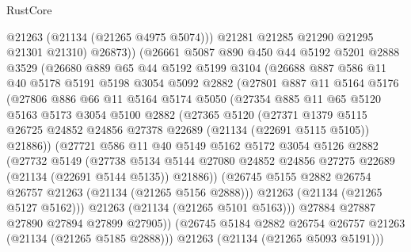 \begin{lexlean}{RustCore}
\begin{coremodule}
              @21263
              (@21134 (@21265 @4975 @5074)))
            @21281
            @21285
            @21290
            @21295
            @21301
            @21310)
          @26873))
      (@26661
        @5087
        @890
        @450
        @44
        @5192
        @5201
        @2888
        @3529
        (@26680
          @889
          @65
          @44
          @5192
          @5199
          @3104
          (@26688
            @887
            @586
            @11
            @40
            @5178
            @5191
            @5198
            @3054
            @5092
            @2882
            (@27801
              @887
              @11
              @5164
              @5176
              (@27806
                @886
                @66
                @11
                @5164
                @5174
                @5050
                (@27354
                  @885
                  @11
                  @65
                  @5120
                  @5163
                  @5173
                  @3054
                  @5100
                  @2882
                  (@27365
                    @5120
                    (@27371
                      @1379
                      @5115
                      @26725
                      @24852
                      @24856
                      @27378
                      @22689
                      (@21134 (@22691 @5115 @5105))
                      @21886))
                  (@27721
                    @586
                    @11
                    @40
                    @5149
                    @5162
                    @5172
                    @3054
                    @5126
                    @2882
                    (@27732
                      @5149
                      (@27738
                        @5134
                        @5144
                        @27080
                        @24852
                        @24856
                        @27275
                        @22689
                        (@21134 (@22691 @5144 @5135))
                        @21886))
                    (@26745 @5155 @2882 @26754 @26757 @21263 (@21134 (@21265 @5156 @2888)))
                    @21263
                    (@21134 (@21265 @5127 @5162)))
                  @21263
                  (@21134 (@21265 @5101 @5163)))
                @27884
                @27887
                @27890
                @27894
                @27899
                @27905))
            (@26745 @5184 @2882 @26754 @26757 @21263 (@21134 (@21265 @5185 @2888)))
            @21263
            (@21134 (@21265 @5093 @5191)))

\end{coremodule}
\end{lexlean}
